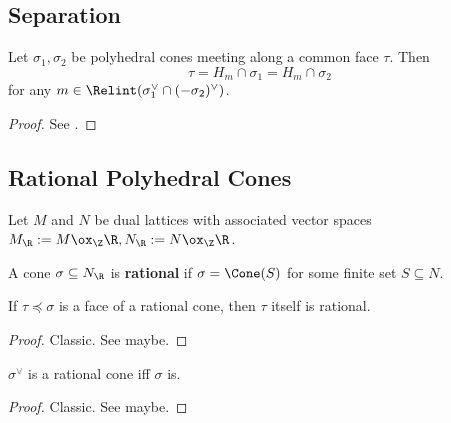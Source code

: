 \subsection{Separation}


\begin{lemma}
  \label{1-2-13-separation-lemma}

  Let $\sigma_1, \sigma_2$ be polyhedral cones meeting along a common face $\tau$. Then
  $$\tau = H_m \cap \sigma_1 = H_m \cap \sigma_2$$
  for any $m \in \Relint(\sigma_1^\vee \cap (-\sigma_2)^\vee)$.
\end{lemma}
\begin{proof}

  See \cite{Cox_2011}.
\end{proof}


\subsection{Rational Polyhedral Cones}


Let $M$ and $N$ be dual lattices with associated vector spaces $M_\R := M \ox_\Z \R, N_\R := N \ox_\Z \R$.


\begin{definition}
  \label{1-2-14-rat-cone}

  A cone $\sigma \subseteq N_\R$ is {\bf rational} if $\sigma = \Cone(S)$ for some finite set $S \subseteq N$.
\end{definition}


\begin{lemma}
  \label{1-2-14-face-rat-cone}

  If $\tau \preceq \sigma$ is a face of a rational cone, then $\tau$ itself is rational.
\end{lemma}
\begin{proof}

  Classic. See \cite{Oda_1988} maybe.
\end{proof}


\begin{lemma}
  \label{1-2-14-dual-rat-cone}

  $\sigma^\vee$ is a rational cone iff $\sigma$ is.
\end{lemma}
\begin{proof}

  Classic. See \cite{Oda_1988} maybe.
\end{proof}


